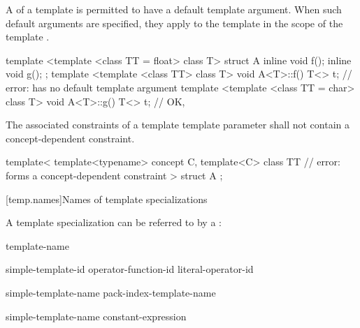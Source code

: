 \pnum
A  of
a template 
is permitted to have a default template argument.
When such default arguments are specified,
they apply to the template 
in the scope of the template .
\begin{example}
\begin{codeblock}
template <template <class TT = float> class T> struct A {
  inline void f();
  inline void g();
};
template <template <class TT> class T> void A<T>::f() {
  T<> t;            // error:  has no default template argument
}
template <template <class TT = char> class T> void A<T>::g() {
  T<> t;            // OK, 
}
\end{codeblock}
\end{example}
The associated constraints of a template template parameter
shall not contain a concept-dependent constraint.
\begin{example}
\begin{codeblock}
template<
  template<typename> concept C,
  template<C> class TT  // error:  forms a concept-dependent constraint
>
struct A {};
\end{codeblock}
\end{example}

[temp.names]{Names of template specializations}

\pnum
A template specialization can be referred to by a
:

\begin{bnf}
\br
  template-name \terminal{<}  \terminal{>}
\end{bnf}

\begin{bnf}
\br
  simple-template-id\br
  operator-function-id \terminal{<}  \terminal{>}\br
  literal-operator-id \terminal{<}  \terminal{>}
\end{bnf}

\begin{bnf}
\br
  simple-template-name\br
  pack-index-template-name
\end{bnf}

\begin{bnf}
\br
  simple-template-name  \terminal{[} constant-expression \terminal{]}
\end{bnf}

